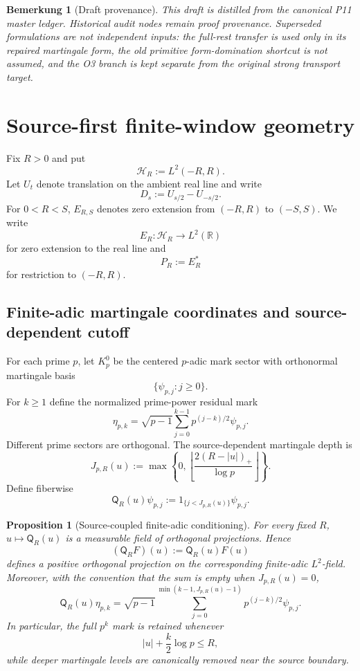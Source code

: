 \documentclass[11pt,a4paper]{amsart}
\newtheorem{proposition}[theorem]{Proposition}
\newtheorem{remark}[theorem]{Bemerkung}
\begin{document}
\begin{remark}[Draft provenance]\label{rem:provenance}
This draft is distilled from the canonical P11 master ledger.  Historical audit nodes
remain proof provenance.  Superseded formulations are not independent inputs: the
full-rest transfer is used only in its repaired martingale form, the old primitive
form-domination shortcut is not assumed, and the O3 branch is kept separate from the
original strong transport target.
\end{remark}

\section{Source-first finite-window geometry}\label{sec:source}

Fix $R>0$ and put
\[
 \mathscr H_R:=L^2(-R,R).
\]
Let $U_t$ denote translation on the ambient real line and write
\[
 D_s:=U_{s/2}-U_{-s/2}.
\]
For $0<R<S$, $E_{R,S}$ denotes zero extension from $(-R,R)$ to $(-S,S)$.  We write
\[
 E_R:\mathscr H_R\to L^2(\mathbb R)
\]
for zero extension to the real line and
\[
 \boxed{P_R:=E_R^*}
\]
for restriction to $(-R,R)$.

\subsection{Finite-adic martingale coordinates and source-dependent cutoff}

For each prime $p$, let $K_p^0$ be the centered $p$-adic mark sector with orthonormal
martingale basis
\[
 \{\psi_{p,j}:j\ge0\}.
\]
For $k\ge1$ define the normalized prime-power residual mark
\[
 \boxed{
 \eta_{p,k}
 =\sqrt{p-1}\sum_{j=0}^{k-1}p^{(j-k)/2}\psi_{p,j}.
 }
\tag{2.1}\label{eq:eta-pk}
\]
Different prime sectors are orthogonal.  The source-dependent martingale depth is
\[
 \boxed{
 J_{p,R}(u)
 :=\max\left\{0,
 \left\lfloor\frac{2(R-|u|)_+}{\log p}\right\rfloor
 \right\}.
 }
\tag{2.2}\label{eq:martingale-depth}
\]
Define fiberwise
\[
 \boxed{
 \mathsf Q_R(u)\psi_{p,j}
 :=1_{\{j<J_{p,R}(u)\}}\psi_{p,j}.
 }
\tag{2.3}\label{eq:source-cutoff}
\]

\begin{proposition}[Source-coupled finite-adic conditioning]\label{prop:source-conditioning}
For every fixed $R$, $u\mapsto\mathsf Q_R(u)$ is a measurable field of orthogonal
projections.  Hence
\[
 (\mathsf Q_RF)(u):=\mathsf Q_R(u)F(u)
\]
defines a positive orthogonal projection on the corresponding finite-adic
$L^2$-field.  Moreover, with the convention that the sum is empty when
$J_{p,R}(u)=0$,
\[
 \mathsf Q_R(u)\eta_{p,k}
 =\sqrt{p-1}\sum_{j=0}^{\min(k-1,J_{p,R}(u)-1)}
 p^{(j-k)/2}\psi_{p,j}.
\tag{2.4}\label{eq:projected-mark}
\]
In particular, the full $p^k$ mark is retained whenever
\[
 |u|+\frac{k}{2}\log p\le R,
\]
while deeper martingale levels are canonically removed near the source boundary.
\end{proposition}
\end{document}
